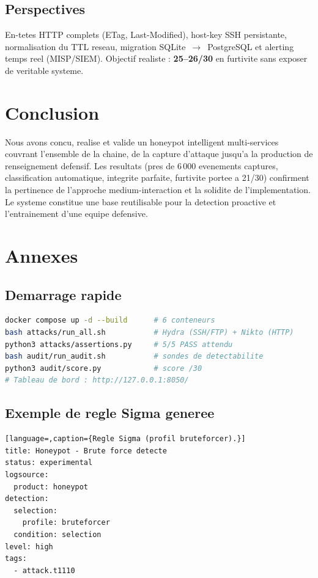 \documentclass[11pt,a4paper]{article}
\begin{document}
\subsection{Perspectives}
En-tetes HTTP complets (ETag, Last-Modified), host-key SSH persistante, normalisation du
TTL reseau, migration SQLite~$\rightarrow$~PostgreSQL et alerting temps reel (MISP/SIEM).
Objectif realiste : \textbf{25--26/30} en furtivite sans exposer de veritable systeme.

\section{Conclusion}
Nous avons concu, realise et valide un honeypot intelligent multi-services couvrant
l'ensemble de la chaine, de la capture d'attaque jusqu'a la production de renseignement
defensif. Les resultats (pres de 6\,000 evenements captures, classification automatique,
integrite parfaite, furtivite portee a 21/30) confirment la pertinence de l'approche
medium-interaction et la solidite de l'implementation. Le systeme constitue une base
reutilisable pour la detection proactive et l'entrainement d'une equipe defensive.

\appendix
\section{Annexes}
\subsection{Demarrage rapide}
\begin{lstlisting}[language=bash,caption={Mise en route et validation.}]
docker compose up -d --build      # 6 conteneurs
bash attacks/run_all.sh           # Hydra (SSH/FTP) + Nikto (HTTP)
python3 attacks/assertions.py     # 5/5 PASS attendu
bash audit/run_audit.sh           # sondes de detectabilite
python3 audit/score.py            # score /30
# Tableau de bord : http://127.0.0.1:8050/
\end{lstlisting}

\subsection{Exemple de regle Sigma generee}
\begin{lstlisting}[language=,caption={Regle Sigma (profil bruteforcer).}]
title: Honeypot - Brute force detecte
status: experimental
logsource:
  product: honeypot
detection:
  selection:
    profile: bruteforcer
  condition: selection
level: high
tags:
  - attack.t1110
\end{lstlisting}
\end{document}
